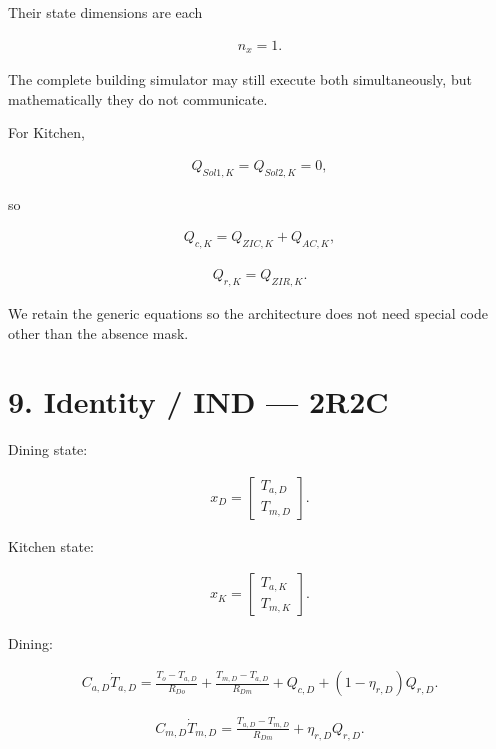 \documentclass[11pt]{article}
\begin{document}
Their state dimensions are each

\begin{align}
n_x=1.
\end{align}

The complete building simulator may still execute both simultaneously, but mathematically they do not communicate.

For Kitchen,

\begin{align}
Q_{Sol1,K}=Q_{Sol2,K}=0,
\end{align}

so

\begin{align}
Q_{c,K}=Q_{ZIC,K}+Q_{AC,K},
\tag{20}
\end{align}

\begin{align}
Q_{r,K}=Q_{ZIR,K}.
\tag{21}
\end{align}

We retain the generic equations so the architecture does not need special code other than the absence mask.

\section*{9. Identity / IND --- 2R2C}

Dining state:

\begin{align}
x_D=
\begin{bmatrix}
T_{a,D}\\T_{m,D}
\end{bmatrix}.
\end{align}

Kitchen state:

\begin{align}
x_K=
\begin{bmatrix}
T_{a,K}\\T_{m,K}
\end{bmatrix}.
\end{align}

Dining:

\begin{align}
\boxed{
C_{a,D}\dot T_{a,D}
=
\frac{T_o-T_{a,D}}{R_{Do}}
+
\frac{T_{m,D}-T_{a,D}}{R_{Dm}}
+
Q_{c,D}
+
(1-\eta_{r,D})Q_{r,D}.
}
\tag{22}
\end{align}

\begin{align}
\boxed{
C_{m,D}\dot T_{m,D}
=
\frac{T_{a,D}-T_{m,D}}{R_{Dm}}
+
\eta_{r,D}Q_{r,D}.
}
\tag{23}
\end{align}
\end{document}
